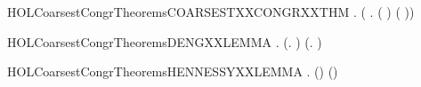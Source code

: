 \newcommand{\HOLCoarsestCongrTheoremsCOARSESTXXCONGRXXRL}{\UseVerbatim{HOLCoarsestCongrTheoremsCOARSESTXXCONGRXXRL}}
\begin{SaveVerbatim}{HOLCoarsestCongrTheoremsCOARSESTXXCONGRXXTHM}
\HOLTokenTurnstile{} \HOLSymConst{\HOLTokenForall{}} .
         \HOLSymConst{\HOLTokenConj{}}   \HOLSymConst{\HOLTokenImp{}}
       (   \HOLSymConst{\HOLTokenEquiv{}} \HOLSymConst{\HOLTokenForall{}}.  ( \HOLSymConst{+} ) ( \HOLSymConst{+} ))
\end{SaveVerbatim}
\newcommand{\HOLCoarsestCongrTheoremsCOARSESTXXCONGRXXTHM}{\UseVerbatim{HOLCoarsestCongrTheoremsCOARSESTXXCONGRXXTHM}}
\begin{SaveVerbatim}{HOLCoarsestCongrTheoremsDENGXXLEMMA}
\HOLTokenTurnstile{} \HOLSymConst{\HOLTokenForall{}} .
          \HOLSymConst{\HOLTokenImp{}}
       (\HOLSymConst{\HOLTokenExists{}}.  \HOLTokenTransBegin\HOLConst{\ensuremath{\tau}}\HOLTokenTransEnd {} \HOLSymConst{\HOLTokenConj{}}   ) \HOLSymConst{\HOLTokenDisj{}}
       (\HOLSymConst{\HOLTokenExists{}}.  \HOLTokenTransBegin\HOLConst{\ensuremath{\tau}}\HOLTokenTransEnd {} \HOLSymConst{\HOLTokenConj{}}   ) \HOLSymConst{\HOLTokenDisj{}}   
\end{SaveVerbatim}
\newcommand{\HOLCoarsestCongrTheoremsDENGXXLEMMA}{\UseVerbatim{HOLCoarsestCongrTheoremsDENGXXLEMMA}}
\begin{SaveVerbatim}{HOLCoarsestCongrTheoremsHENNESSYXXLEMMA}
\HOLTokenTurnstile{} \HOLSymConst{\HOLTokenForall{}} .
          \HOLSymConst{\HOLTokenEquiv{}}
          \HOLSymConst{\HOLTokenDisj{}}   (\HOLConst{\ensuremath{\tau}}) \HOLSymConst{\HOLTokenDisj{}}  (\HOLConst{\ensuremath{\tau}}) 
\end{SaveVerbatim}
